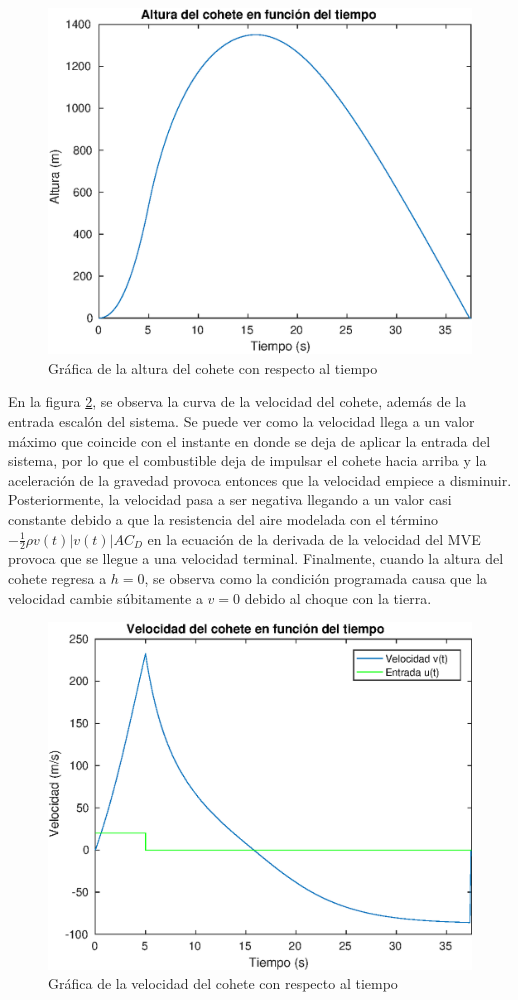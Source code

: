 \documentclass[12pt,letterpaper]{article}
\begin{document}
\begin{figure}[ht!]
  \centering
  \includegraphics[width=0.5\linewidth]{pictures/Ejercicio3/altura_cohete_vs_tiempo.eps}
  \caption{Gráfica de la altura del cohete con respecto al tiempo}
  \label{fig:alt_cohete}
\end{figure}

En la figura \ref{fig:vel_cohete}, se observa la curva de la velocidad del cohete, además de la
entrada escalón del sistema. Se puede ver como la velocidad llega a un valor máximo que coincide con
el instante en donde se deja de aplicar la entrada del sistema, por lo que el combustible deja de
impulsar el cohete hacia arriba y la aceleración de la gravedad provoca entonces que la velocidad
empiece a disminuir. Posteriormente, la velocidad pasa a ser negativa llegando a un valor casi
constante debido a que la resistencia del aire modelada con el término
$-\frac{1}{2}\rho v(t)|v(t)| A C_D$ en la ecuación de la derivada de la velocidad del MVE provoca
que se llegue a una velocidad terminal. Finalmente, cuando la altura del cohete regresa a $h=0$, se
observa como la condición programada causa que la velocidad cambie súbitamente a $v=0$ debido al
choque con la tierra.

\begin{figure}[ht!]
  \centering
  \includegraphics[width=0.5\linewidth]{pictures/Ejercicio3/velocidad_cohete_vs_tiempo.eps}
  \caption{Gráfica de la velocidad del cohete con respecto al tiempo}
  \label{fig:vel_cohete}
\end{figure}
\end{document}
